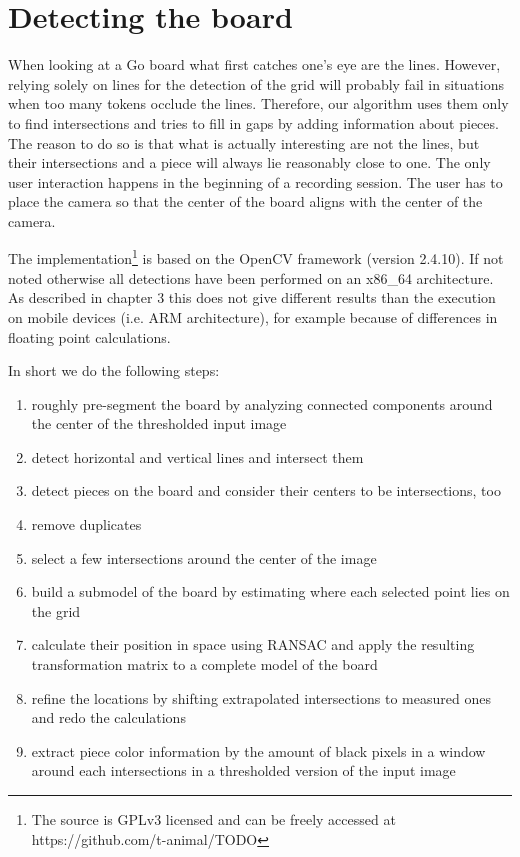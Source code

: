 
\chapter{Detecting the board}
	\label{detector}
	When looking at a Go board what first catches one's eye are the lines. However, relying solely on lines for the detection of the grid will probably fail in situations when too many tokens occlude the lines. Therefore, our algorithm uses them only to find intersections and tries to fill in gaps by adding information about pieces. The reason to do so is that what is actually interesting are not the lines, but their intersections and a piece will always lie reasonably close to one. The only user interaction happens in the beginning of a recording session. The user has to place the camera so that the center of the board aligns with the center of the camera.

	The implementation\footnote{The source is GPLv3 licensed and can be freely accessed at https://github.com/t-animal/TODO} is based on the OpenCV framework (version 2.4.10). If not noted otherwise all detections have been performed on an x86\_64 architecture. As described in chapter 3 this does not give different results than the execution on mobile devices (i.e. ARM architecture), for example because of differences in floating point calculations.

	In short we do the following steps:
	\begin{enumerate}
		\item roughly pre-segment the board by analyzing connected components around the center of the thresholded input image
		\item detect horizontal and vertical lines and intersect them
		\item detect pieces on the board and consider their centers to be intersections, too
		\item remove duplicates
		\item select a few intersections around the center of the image
		\item build a submodel of the board by estimating where each selected point lies on the grid
		\item calculate their position in space using RANSAC and apply the resulting transformation matrix to a complete model of the board
		\item refine the locations by shifting extrapolated intersections to measured ones and redo the calculations
		\item extract piece color information by the amount of black pixels in a window around each intersections in a thresholded version of the input image
	\end{enumerate}

